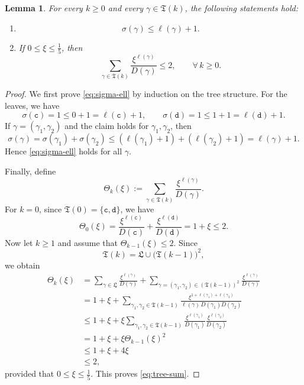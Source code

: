 \documentclass[12pt,reqno,tbtags]{amsart}
\newtheorem{lemma}{Lemma}[section]
\newcommand\1{\mathbbm{1}}
\begin{document}
\begin{lemma}\label{lem:combinatorics}
For every $k\geq 0$ and every $\gamma\in \mathfrak{T}(k)$, the following statements hold:
\begin{enumerate}
\item
\begin{equation}\label{eq:sigma-ell}
\sigma(\gamma)\leq \ell(\gamma)+1.
\end{equation}

\item
If $0\leq \xi\leq \frac15$, then
\begin{equation}\label{eq:tree-sum}
\sum_{\gamma\in \mathfrak{T}(k)} \frac{\xi^{\ell(\gamma)}}{D(\gamma)} \leq 2,
\qquad \forall\, k\geq 0.
\end{equation}
\end{enumerate}
\end{lemma}

\begin{proof}
We first prove \eqref{eq:sigma-ell} by induction on the tree structure.
For the leaves, we have
\[
\sigma(\mathtt{c})=1\leq 0+1=\ell(\mathtt{c})+1,
\qquad
\sigma(\mathtt{d})=1\leq 1+1=\ell(\mathtt{d})+1.
\]
If $\gamma=(\gamma_1,\gamma_2)$ and the claim holds for $\gamma_1,\gamma_2$, then
\[
\sigma(\gamma)
=\sigma(\gamma_1)+\sigma(\gamma_2)
\leq (\ell(\gamma_1)+1)+(\ell(\gamma_2)+1)
=\ell(\gamma)+1.
\]
Hence \eqref{eq:sigma-ell} holds for all $\gamma$.

Finally, define
\[
\Theta_k(\xi):=
\sum_{\gamma\in \mathfrak{T}(k)} \frac{\xi^{\ell(\gamma)}}{D(\gamma)}.
\]
For $k=0$, since $\mathfrak{T}(0)=\{\mathtt{c},\mathtt{d}\}$, we have
\[
\Theta_0(\xi)
=
\frac{\xi^{\ell(\mathtt{c})}}{D(\mathtt{c})}
+
\frac{\xi^{\ell(\mathtt{d})}}{D(\mathtt{d})}
=1+\xi
\leq 2.
\]
Now let $k\geq 1$ and assume that $\Theta_{k-1}(\xi)\leq 2$. Since
\[
\mathfrak{T}(k)=\mathfrak{L}\cup \big(\mathfrak{T}(k-1)\big)^2,
\]
we obtain
\begin{align*}
\Theta_k(\xi)
&=
\sum_{\gamma\in \mathfrak{L}} \frac{\xi^{\ell(\gamma)}}{D(\gamma)}
+
\sum_{\gamma=(\gamma_1,\gamma_2)\in (\mathfrak{T}(k-1))^2}
\frac{\xi^{\ell(\gamma)}}{D(\gamma)} \\
&=
1+\xi
+
\sum_{\gamma_1,\gamma_2\in \mathfrak{T}(k-1)}
\frac{\xi^{1+\ell(\gamma_1)+\ell(\gamma_2)}}{
\ell(\gamma)\,D(\gamma_1)D(\gamma_2)} \\
&\leq
1+\xi
+
\xi
\sum_{\gamma_1,\gamma_2\in \mathfrak{T}(k-1)}
\frac{\xi^{\ell(\gamma_1)}}{D(\gamma_1)}
\frac{\xi^{\ell(\gamma_2)}}{D(\gamma_2)} \\
&=
1+\xi+\xi \Theta_{k-1}(\xi)^2 \\
&\leq
1+\xi+4\xi \\
&\leq 2,
\end{align*}
provided that $0\leq \xi\leq \frac15$. This proves \eqref{eq:tree-sum}.
\end{proof}
\end{document}

